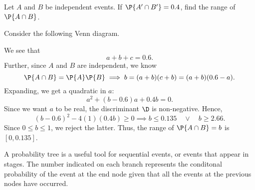 \begin{sample}
    Let $A$ and $B$ be independent events. If $\P{A' \cap B'} = 0.4$, find the range of $\P{A \cap B}$.
\end{sample}
\begin{sampans}
    Consider the following Venn diagram.
    \begin{figure}[H]
        \centering
        \caption{}
    \end{figure}
    We see that \[a + b + c = 0.6. \tag{$\ast$}\] Further, since $A$ and $B$ are independent, we know \[\P{A \cap B} = \P{A} \P{B} \implies b = (a+b)(c+b) = (a+b)(0.6 - a).\] Expanding, we get a quadratic in $a$: \[a^2 + (b - 0.6)a + 0.4 b = 0.\] Since we want $a$ to be real, the discriminant $\D$ is non-negative. Hence, \[(b-0.6)^2 - 4(1)(0.4b) \geq 0 \implies b \leq 0.135 \quad \lor \quad b \geq 2.66.\] Since $0 \leq b \leq 1$, we reject the latter. Thus, the range of $\P{A \cap B} = b$ is $[0, 0.135]$.
\end{sampans}

\begin{recipe}
    A probability tree is a useful tool for sequential events, or events that appear in stages. The number indicated on each branch represents the conditonal probability of the event at the end node given that all the events at the previous nodes have occurred.
\end{recipe}

